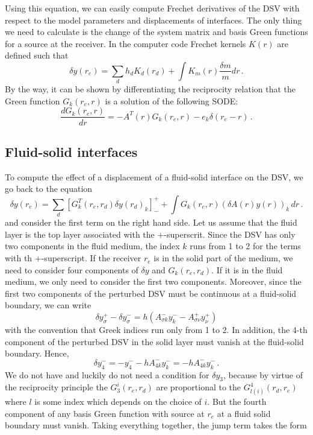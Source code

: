 \documentclass[11pt,a4paper]{article}
\begin{document}
Using this equation, we can easily compute Frechet derivatives of the DSV with respect to the model parameters and displacements of interfaces. The only thing we need to calculate is the change of the system matrix and basis Green functions for a source at the receiver. In the computer code Frechet kernels $K(r)$ are defined such that
\begin{equation}
\delta y(r_e) = \sum_d h_d K_d(r_d) + \int K_m(r) \frac{\delta m}{m} dr \,.
\end{equation}
By the way, it can be shown by differentiating the reciprocity relation that the Green function $G_k(r_e,r)$ is a solution of the following SODE:
\begin{equation}
\frac{dG_k(r_e,r)}{dr}=-A^T(r)G_k(r_e,r)-e_k\delta(r_e-r) \,.
\end{equation}
%
\subsection{Fluid-solid interfaces}
%
To compute the effect of a displacement of a fluid-solid interface on the DSV, we go back to the equation
\begin{equation}
\delta y(r_e) = \sum_d\left[G_k^T(r_e,r_d)\delta y(r_d)_k\right]^+_- +\int G_k(r_e,r)(\delta A(r) y(r))_k \,dr \,.
\end{equation}
and consider the first term on the right hand side. Let us assume that the fluid layer is the top layer associated with the $+$-superscrit. Since the DSV has only two components in the fluid medium, the index $k$ runs from 1 to 2 for the terms with th $+$-superscript. If the receiver $r_e$ is in the solid part of the medium, we need to consider four components of $\delta y$ and $G_k(r_e,r_d)$. If it is in the fluid medium, we only need to consider the first two components. Moreover, since the first two components of the perturbed DSV must be continuous at a fluid-solid boundary, we can write
\begin{equation}
\delta y^+_\sigma -\delta y^-_\sigma = h(A^-_{\sigma k} y^-_k -A^+_{\sigma\nu} y^+_\nu)
\end{equation}
with the convention that Greek indices run only from 1  to 2.
In addition, the 4-th component of the perturbed DSV in the solid layer must vanish at the fluid-solid boundary. Hence,
\begin{equation}
\delta y_4^-=-y_4^- -hA_{4k}^- y_k^- = -hA_{4k}^- y_k^- \,.
\end{equation}
We do not have and luckily do not need a condition for $\delta y_3$, because by virtue of the reciprocity principle the $G_3^i(r_e,r_d)$ are proportional to the $G_{l(i)}^4(r_d,r_e)$ where $l$ is some index which depends on the choice of $i$. But the fourth component of any basis Green function with source at $r_e$ at a fluid solid boundary must vanish. Taking everything together, the jump term takes the form
\end{document}
